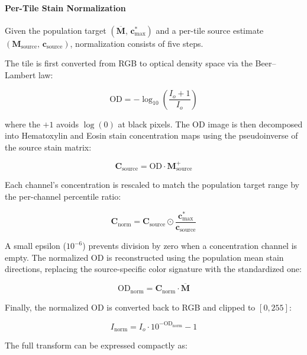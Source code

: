 \paragraph{Per-Tile Stain Normalization}
Given the population target $(\overline{\mathbf{M}},\, \mathbf{c}^*_{\max})$ and a per-tile source estimate $(\mathbf{M}_{\text{source}},\, \mathbf{c}_{\text{source}})$, normalization consists of five steps.

The tile is first converted from RGB to optical density space via the Beer--Lambert law:

\begin{equation}
    \text{OD} = -\log_{10}\!\left(\frac{I_o + 1}{I_o}\right)
\end{equation}

where the $+1$ avoids $\log(0)$ at black pixels. The OD image is then decomposed into Hematoxylin and Eosin stain concentration maps using the pseudoinverse of the source stain matrix:

\begin{equation}
    \mathbf{C}_{\text{source}} = \text{OD} \cdot \mathbf{M}_{\text{source}}^+
\end{equation}

Each channel's concentration is rescaled to match the population target range by the per-channel percentile ratio:

\begin{equation}
    \mathbf{C}_{\text{norm}} = \mathbf{C}_{\text{source}} \odot \frac{\mathbf{c}^*_{\max}}{\mathbf{c}_{\text{source}}}
\end{equation}

A small epsilon ($10^{-6}$) prevents division by zero when a concentration channel is empty. The normalized OD is reconstructed using the population mean stain directions, replacing the source-specific color signature with the standardized one:

\begin{equation}
    \text{OD}_{\text{norm}} = \mathbf{C}_{\text{norm}} \cdot \overline{\mathbf{M}}
\end{equation}

Finally, the normalized OD is converted back to RGB and clipped to $[0, 255]$:

\begin{equation}
    I_{\text{norm}} = I_o \cdot 10^{-\text{OD}_{\text{norm}}} - 1
\end{equation}

The full transform can be expressed compactly as:


